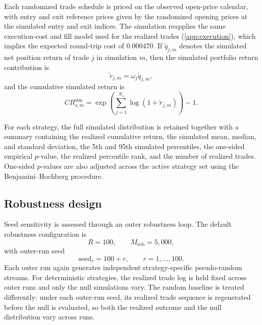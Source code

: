 \documentclass[preprint,12pt]{elsarticle}
\theoremstyle{definition}
\begin{document}
Each randomized trade schedule is priced on the observed open-price calendar, with entry and exit reference prices given by the randomized opening prices at the simulated entry and exit indices. The simulation reapplies the same execution-cost and fill model used for the realized trades (\ref{app:execution}), which implies the expected round-trip cost of $0.000470$. If \(\tilde{q}_{j,m}\) denotes the simulated net position return of trade \(j\) in simulation \(m\), then the simulated portfolio return contribution is
\begin{equation}
\tilde{r}_{j,m}=\omega_j \tilde{q}_{j,m},
\end{equation}
and the cumulative simulated return is
\begin{equation}
CR_{s,m}^{\mathrm{sim}}
=
\exp\left(\sum_{j=1}^{N_s}\log(1+\tilde{r}_{j,m})\right)-1.
\end{equation}

For each strategy, the full simulated distribution is retained together with a summary containing the realized cumulative return, the simulated mean, median, and standard deviation, the 5th and 95th simulated percentiles, the one-sided empirical \(p\)-value, the realized percentile rank, and the number of realized trades. One-sided \(p\)-values are also adjusted across the active strategy set using the Benjamini--Hochberg procedure.

\subsection{Robustness design}

Seed sensitivity is assessed through an outer robustness loop. The default robustness configuration is
\begin{equation}
R=100, \qquad M_{\mathrm{rob}}=5{,}000,
\end{equation}
with outer-run seed
\begin{equation}
\text{seed}_r = 100 + r, \qquad r=1,\ldots,100.
\end{equation}
Each outer run again generates independent strategy-specific pseudo-random streams. For deterministic strategies, the realized trade log is held fixed across outer runs and only the null simulations vary. The random baseline is treated differently: under each outer-run seed, its realized trade sequence is regenerated before the null is evaluated, so both the realized outcome and the null distribution vary across runs.
\end{document}
